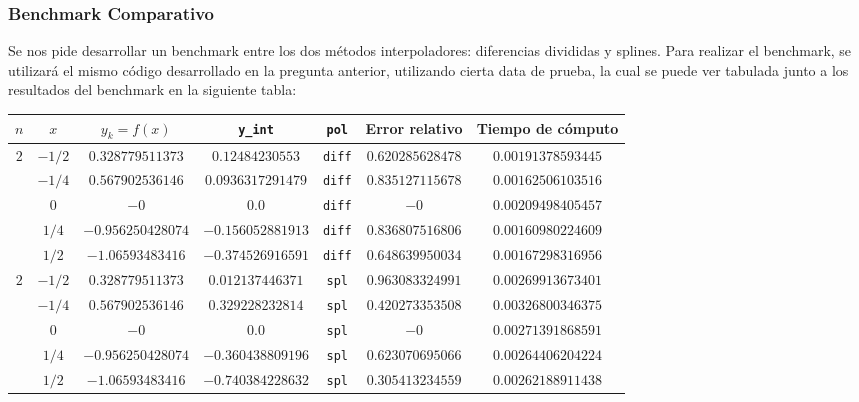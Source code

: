 \documentclass[12pt,letterpaper]{article}
\begin{document}
\subsubsection{Benchmark Comparativo}
Se nos pide desarrollar un benchmark entre los dos métodos interpoladores: diferencias divididas y splines. Para realizar el benchmark, se utilizará el mismo código desarrollado en la pregunta anterior, utilizando cierta data de prueba, la cual se puede ver tabulada junto a los resultados del benchmark en la siguiente tabla:
\begin{sidewaystable}
\begin{center}
	\begin{tabular}{|c|c|c|c|c|c|c|}
		\hline
		$n$ & $x$ & $y_k = f(x)$ & \verb+y_int+ & \verb+pol+ & \textbf{Error relativo} & \textbf{Tiempo de cómputo} \\
		\hline \hline
			
		\multirow{5}{*}{$2$}
			& $-1/2$ & $0.328779511373$ & $0.12484230553$ & \verb+diff+ & $0.620285628478$ & $0.00191378593445$ \\
			& $-1/4$ & $0.567902536146$ & $0.0936317291479$ & \verb+diff+ & $0.835127115678$ & $0.00162506103516$ \\
			& $0$ & $-0$ & $0.0$ & \verb+diff+ & $-0$ & $0.00209498405457$ \\
			& $1/4$ & $-0.956250428074$ & $-0.156052881913$ & \verb+diff+ & $0.836807516806$ & $0.00160980224609$ \\
			& $1/2$ & $-1.06593483416$ & $-0.374526916591$ & \verb+diff+ & $0.648639950034$ & $0.00167298316956$ \\
		\hline
		\multirow{5}{*}{$2$}
			& $-1/2$ & $0.328779511373$ & $0.012137446371$ & \verb+spl+ & $0.963083324991$ & $0.00269913673401$ \\
			& $-1/4$ & $0.567902536146$ & $0.329228232814$ & \verb+spl+ & $0.420273353508$ & $0.00326800346375$ \\
			& $0$ & $-0$ & $0.0$ & \verb+spl+ & $-0$ & $0.00271391868591$ \\
			& $1/4$ & $-0.956250428074$ & $-0.360438809196$ & \verb+spl+ & $0.623070695066$ & $0.00264406204224$ \\
			& $1/2$ & $-1.06593483416$ & $-0.740384228632$ & \verb+spl+ & $0.305413234559$ & $0.00262188911438$ \\
		\hline \hline
		

\end{tabular}
\end{center}
\end{sidewaystable}
\end{document}
